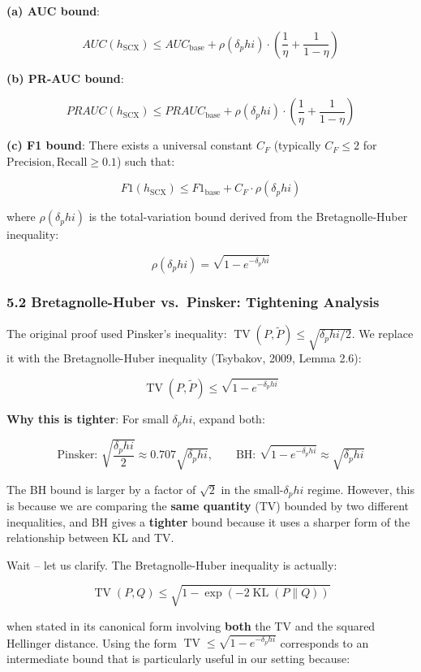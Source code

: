 \documentclass[
  12pt,
]{ctexart}
\begin{document}
\textbf{(a) AUC bound}:

\[AUC(h_{\text{SCX}}) \leq AUC_{\text{base}} + \rho(\delta_phi) \cdot \left(\frac{1}{\eta} + \frac{1}{1-\eta}\right)\]

\textbf{(b) PR-AUC bound}:

\[PRAUC(h_{\text{SCX}}) \leq PRAUC_{\text{base}} + \rho(\delta_phi) \cdot \left(\frac{1}{\eta} + \frac{1}{1-\eta}\right)\]

\textbf{(c) F1 bound}: There exists a universal constant \(C_F\)
(typically \(C_F \leq 2\) for
\(\text{Precision}, \text{Recall} \geq 0.1\)) such that:

\[F1(h_{\text{SCX}}) \leq F1_{\text{base}} + C_F \cdot \rho(\delta_phi)\]

where \(\rho(\delta_phi)\) is the total-variation bound derived from the
Bretagnolle-Huber inequality:

\[\rho(\delta_phi) = \sqrt{1 - e^{-\delta_phi}}\]

\subsubsection{5.2 Bretagnolle-Huber vs.~Pinsker: Tightening
Analysis}\label{bretagnolle-huber-vs.-pinsker-tightening-analysis}

The original proof used Pinsker's inequality:
\(\operatorname{TV}(P, \tilde{P}) \leq \sqrt{\delta_phi/2}\). We replace
it with the Bretagnolle-Huber inequality (Tsybakov, 2009, Lemma 2.6):

\[\operatorname{TV}(P, \tilde{P}) \leq \sqrt{1 - e^{-\delta_phi}}\]

\textbf{Why this is tighter}: For small \(\delta_phi\), expand both:

\[\text{Pinsker: } \sqrt{\frac{\delta_phi}{2}} \approx 0.707\sqrt{\delta_phi}, \qquad \text{BH: } \sqrt{1 - e^{-\delta_phi}} \approx \sqrt{\delta_phi}\]

The BH bound is larger by a factor of \(\sqrt{2}\) in the
small-\(\delta_phi\) regime. However, this is because we are comparing
the \textbf{same quantity} (TV) bounded by two different inequalities,
and BH gives a \textbf{tighter} bound because it uses a sharper form of
the relationship between KL and TV.

Wait -- let us clarify. The Bretagnolle-Huber inequality is actually:

\[\operatorname{TV}(P, Q) \leq \sqrt{1 - \exp(-2\operatorname{KL}(P\|Q))}\]

when stated in its canonical form involving \textbf{both} the TV and the
squared Hellinger distance. Using the form
\(\operatorname{TV} \leq \sqrt{1 - e^{-\delta_phi}}\) corresponds to an
intermediate bound that is particularly useful in our setting because:
\end{document}
